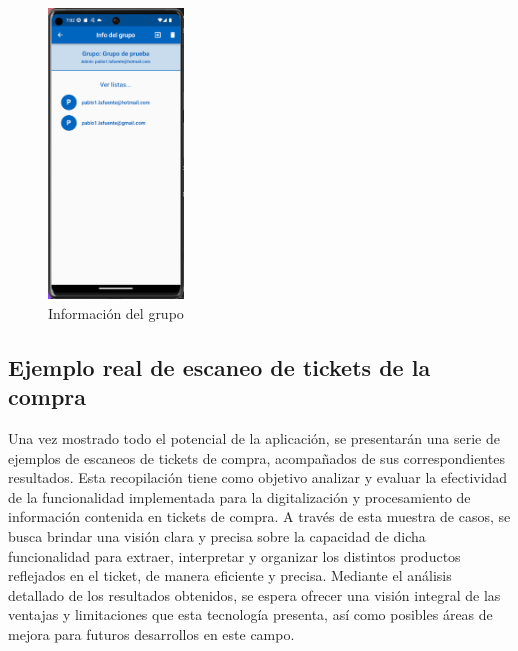 \documentclass{article}
\begin{document}
\begin{figure}[h]
    \centering
    \includegraphics[width=0.32\textwidth]{imagenes/pantallas/grupos/info_grupo.png}
    \caption{Información del grupo}
\end{figure}

\subsection{Ejemplo real de escaneo de tickets de la compra}

Una vez mostrado todo el potencial de la aplicación, se presentarán una serie de ejemplos de escaneos de tickets de compra, acompañados de sus correspondientes resultados. Esta recopilación tiene como objetivo analizar y evaluar la efectividad de la funcionalidad implementada para la digitalización y procesamiento de información contenida en tickets de compra. 
A través de esta muestra de casos, se busca brindar una visión clara y precisa sobre la capacidad de dicha funcionalidad para extraer, interpretar y organizar los distintos productos reflejados en el ticket, de manera eficiente y precisa. Mediante el análisis detallado de los resultados obtenidos, se espera ofrecer una visión integral de las ventajas y limitaciones que esta tecnología presenta, así como posibles áreas de mejora para futuros desarrollos en este campo.
\end{document}
